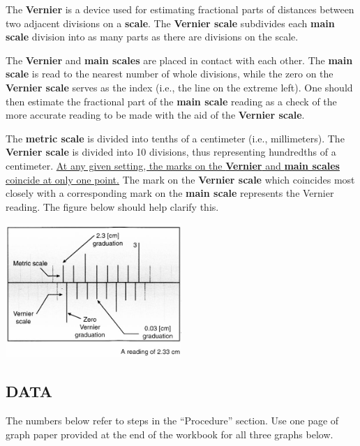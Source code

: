 The \textbf{Vernier} is a device used for estimating fractional parts of distances between two adjacent divisions on a \textbf{scale}.  The \textbf{Vernier scale} subdivides each \textbf{main scale} division into as many parts as there are divisions on the scale.

The \textbf{Vernier} and \textbf{main scales} are placed in contact with each other.  The \textbf{main scale} is read to the nearest number of whole divisions, while the zero on the \textbf{Vernier scale} serves as the index (i.e., the line on the extreme left).  One should then estimate the fractional part of the \textbf{main scale} reading as a check of the more accurate reading to be made with the aid of the \textbf{Vernier scale}.

The \textbf{metric scale} is divided into tenths of a centimeter (i.e., millimeters).  The \textbf{Vernier scale} is divided into 10 divisions, thus representing hundredths of a centimeter.  \ul{At any given setting, the marks on the \textbf{Vernier} and \textbf{main scales} coincide at only one point.}  The mark on the \textbf{Vernier scale} which coincides most closely with a corresponding mark on the \textbf{main scale} represents the Vernier reading.  The figure below should help clarify this.
\begin{center} \includegraphics*[width=0.5\textwidth]{imgs/6labs/6Alab/6Aexp2/caliper_alt_2.jpg} \end{center}

\subsection*{DATA}

The numbers below refer to steps in the ``Procedure'' section.  Use one page of graph paper provided at the end of the workbook for all three graphs below.

